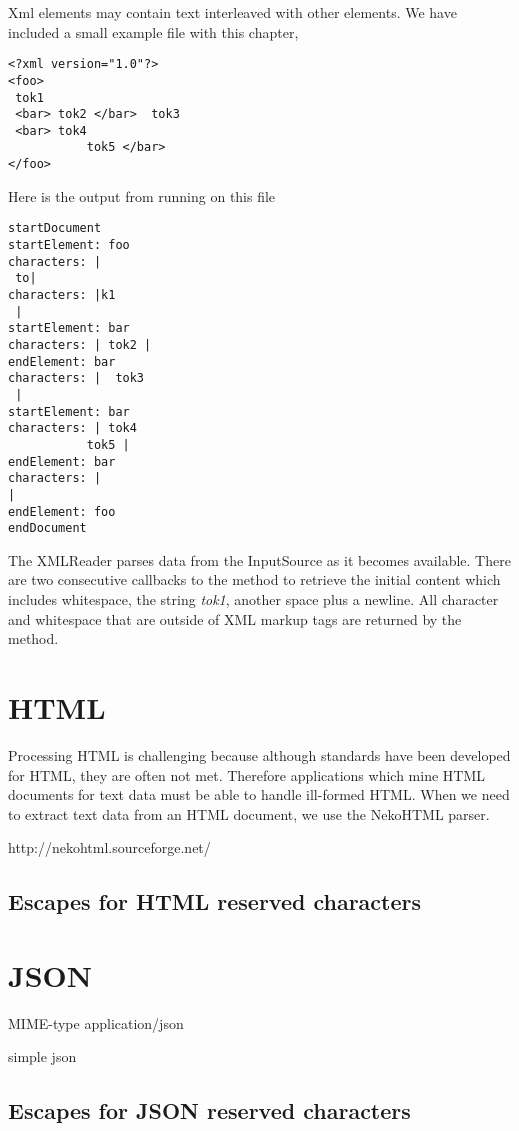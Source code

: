 Xml elements may contain text interleaved with other elements.
We have included a small example file with this chapter,
%
\begin{verbatim}
<?xml version="1.0"?>
<foo> 
 tok1 
 <bar> tok2 </bar>  tok3 
 <bar> tok4 
           tok5 </bar>
</foo>
\end{verbatim} 
Here is the output from running  on this file
\begin{verbatim} 
startDocument
startElement: foo
characters: | 
 to|
characters: |k1 
 |
startElement: bar
characters: | tok2 |
endElement: bar
characters: |  tok3 
 |
startElement: bar
characters: | tok4 
           tok5 |
endElement: bar
characters: |
|
endElement: foo
endDocument
\end{verbatim}
The XMLReader parses data from the InputSource as it becomes available.
There are two consecutive callbacks to the  method to
retrieve the initial content which includes whitespace, the string \emph{tok1},
another space plus a newline.
All character and whitespace that are outside of XML markup tags are returned
by the  method.







\section{HTML}

Processing HTML is challenging because although standards
have been developed for HTML, they are often not met.
Therefore applications which mine HTML documents for text data
must be able to handle ill-formed HTML.
When we need to extract text data from an HTML document,
we use the NekoHTML parser.

http://nekohtml.sourceforge.net/

\subsection{Escapes for HTML reserved characters}

\section{JSON}

MIME-type application/json

simple json

\subsection{Escapes for JSON reserved characters}


